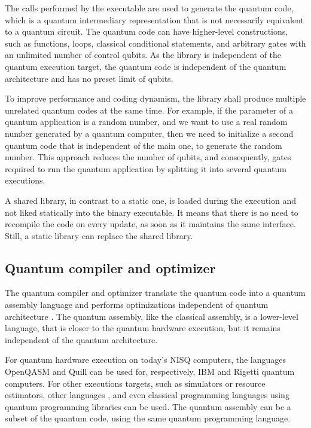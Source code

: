 \documentclass[preprint,3p,times,twocolumn]{elsarticle}
\begin{document}
The calls performed by the executable are used to generate the quantum code,
which is a quantum intermediary representation that is not necessarily
equivalent to a quantum circuit. The quantum code can have higher-level
constructions, such as functions, loops, classical conditional statements, and
arbitrary gates with an unlimited number of control qubits. As the library is
independent of the quantum execution target, the quantum code is independent of
the quantum architecture and has no preset limit of qubits.

To improve performance and coding dynamism, the library shall produce multiple
unrelated quantum codes at the same time. For example, if the parameter of a
quantum application is a random number, and we want to use a real random number
generated by a quantum computer, then we need to initialize a second quantum
code that is independent of the main one, to generate the random number. This
approach reduces the number of qubits, and consequently, gates required to run
the quantum application by splitting it into several quantum executions.

A shared library, in contrast to a static one, is loaded during the execution
and not liked statically into the binary executable. It means that there is no
need to recompile the code on every update, as soon as it maintains the same
interface. Still, a static library can replace the shared library.

\subsection{Quantum compiler and optimizer}

The quantum compiler and optimizer translate the quantum code into a quantum
assembly language and performs optimizations independent of quantum
architecture \cite{Kissinger2019, Nam2018}. The quantum assembly, like the
classical assembly, is a lower-level language, that is closer to the quantum
hardware execution, but it remains independent of the quantum architecture.

For quantum hardware execution on today's NISQ computers, the languages
OpenQASM \cite{Cross2017} and Quill \cite{Smith2016} can be used for,
respectively, IBM and Rigetti quantum computers.  For other executions targets,
such as simulators or resource estimators, other languages \cite{Green2013,
Steiger2018}, and even classical programming languages using quantum
programming libraries \cite{Rosa2020, qiskit, Smith2016, Gidney2018} can be
used. The quantum assembly can be a subset of the quantum code, using the same
quantum programming language.
\end{document}
